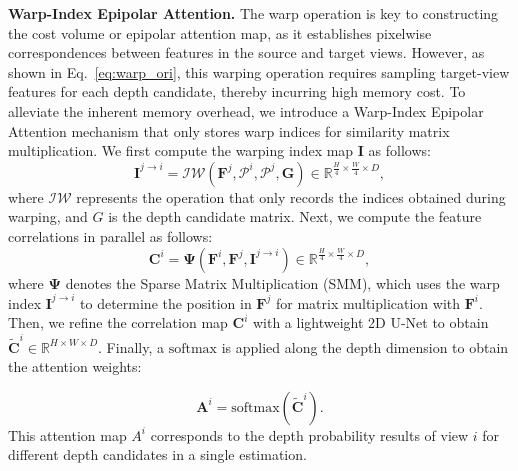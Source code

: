 \noindent \textbf{Warp-Index Epipolar Attention.}
%
The warp operation is key to constructing the cost volume or epipolar attention map, as it establishes pixelwise correspondences between features in the source and target views.
%
However, as shown in Eq.~\eqref{eq:warp_ori}, this warping operation requires sampling target-view features for each depth candidate, thereby incurring high memory cost.
%
To alleviate the inherent memory overhead, we introduce a Warp-Index Epipolar Attention mechanism that only stores warp indices for similarity matrix multiplication.
%
We first compute the warping index map $\bm{I}$ as follows:
%
%
\begin{equation}
\label{eq:warp}
    {\bm I}^{j \to i} = \mathcal{IW}({\bm F}^j, {\mathcal P}^i, {\mathcal P}^j, \bm G) \in \mathbb{R}^{\frac{H}{4} \times \frac{W}{4} \times D},
\end{equation}
%
where $\mathcal{IW}$ represents the operation that only records the indices obtained during warping, and $G$ is the depth candidate matrix.
%
Next, we compute the feature correlations in parallel as follows:
%
%
\begin{equation}
\label{eq:correlation}
    {\bm C}^{i} = \mathbf{\Psi}({\bm F}^i, {\bm F}^j, {\bm I}^{j \to i}) \in \mathbb{R}^{\frac{H}{4} \times \frac{W}{4} \times D},
\end{equation}
%
where $\mathbf{\Psi}$ denotes the Sparse Matrix Multiplication (SMM), which uses the warp index ${\bm I}^{j \to i}$ to determine the position in ${\bm F}^j$ for matrix multiplication with ${\bm F}^i$.
%
%
%
Then, we refine the correlation map $\bm{C}^{i}$ with a lightweight 2D U-Net to obtain $\tilde{\bm{C}}^{i} \in \mathbb{R}^{H \times W \times D}$. Finally, a $\mathrm{softmax}$ is applied along the depth dimension to obtain the attention weights:

%
\begin{equation}
\bm{A}^{i}=\mathrm{softmax} (\tilde{\bm{C}}^{i}).
\end{equation}
%
This attention map $A^{i}$ corresponds to the depth probability results of view $i$ for different depth candidates in a single estimation.
%

